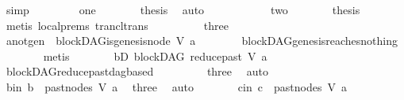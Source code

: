 \begin{isabellebody}
\ simp\isanewline
\ \ \isamarkupfalse%
\isanewline
\ \ \ \ \isamarkupfalse%
\ one\isanewline
\ \ \ \ \isamarkupfalse%
\ \isamarkupfalse%
\ {\isacharquery}{\kern0pt}thesis\ \isamarkupfalse%
\ auto\ \ \ \isanewline
\ \ \isamarkupfalse%
\isanewline
\ \ \ \ \isamarkupfalse%
\ two\isanewline
\ \ \ \ \isamarkupfalse%
\ \isamarkupfalse%
\ {\isacharquery}{\kern0pt}thesis\isanewline
\ \ \ \ \ \ \isamarkupfalse%
\ {\isacharparenleft}{\kern0pt}metis\ {\isachardoublequoteopen}local{\isachardot}{\kern0pt}{}{\isachardot}{\kern0pt}prems{\isachardoublequoteclose}\ trancl{\isacharunderscore}{\kern0pt}trans{\isacharparenright}{\kern0pt}\ \isanewline
\ \ \isamarkupfalse%
\isanewline
\ \ \ \ \isamarkupfalse%
\ three\isanewline
\ \ \ \ \isamarkupfalse%
\ \isamarkupfalse%
\ a{\isacharunderscore}{\kern0pt}not{\isacharunderscore}{\kern0pt}gen{\isacharcolon}{\kern0pt}\ {\isachardoublequoteopen}{\isasymnot}\ blockDAG{\isachardot}{\kern0pt}is{\isacharunderscore}{\kern0pt}genesis{\isacharunderscore}{\kern0pt}node\ V\ a{\isachardoublequoteclose}\isanewline
\ \ \ \ \ \ \isamarkupfalse%
\ blockDAG{\isachardot}{\kern0pt}genesis{\isacharunderscore}{\kern0pt}reaches{\isacharunderscore}{\kern0pt}nothing\isanewline
\ \ \ \ \ \ \isamarkupfalse%
\ metis\isanewline
\ \ \ \ \isamarkupfalse%
\ \isamarkupfalse%
\ bD{\isacharcolon}{\kern0pt}\ {\isachardoublequoteopen}blockDAG\ {\isacharparenleft}{\kern0pt}reduce{\isacharunderscore}{\kern0pt}past\ V\ a{\isacharparenright}{\kern0pt}{\isachardoublequoteclose}\ \isamarkupfalse%
\ blockDAG{\isachardot}{\kern0pt}reduce{\isacharunderscore}{\kern0pt}past{\isacharunderscore}{\kern0pt}dagbased\ \isanewline
\ \ \ \ \ \ \ \ three\ \isamarkupfalse%
\ auto\isanewline
\ \ \ \ \isamarkupfalse%
\ b{\isacharunderscore}{\kern0pt}in{}{\isacharcolon}{\kern0pt}\ {\isachardoublequoteopen}b\ {\isasymin}\ past{\isacharunderscore}{\kern0pt}nodes\ V\ a{\isachardoublequoteclose}\ \isamarkupfalse%
\ three\ \isamarkupfalse%
\ auto\isanewline
\ \ \ \ \isamarkupfalse%
\ \isamarkupfalse%
\ c{\isacharunderscore}{\kern0pt}in{}{\isacharcolon}{\kern0pt}\ {\isachardoublequoteopen}c\ {\isasymin}\ past{\isacharunderscore}{\kern0pt}nodes\ V\ a{\isachardoublequoteclose}\ \isamarkupfalse%

\end{isabellebody}
